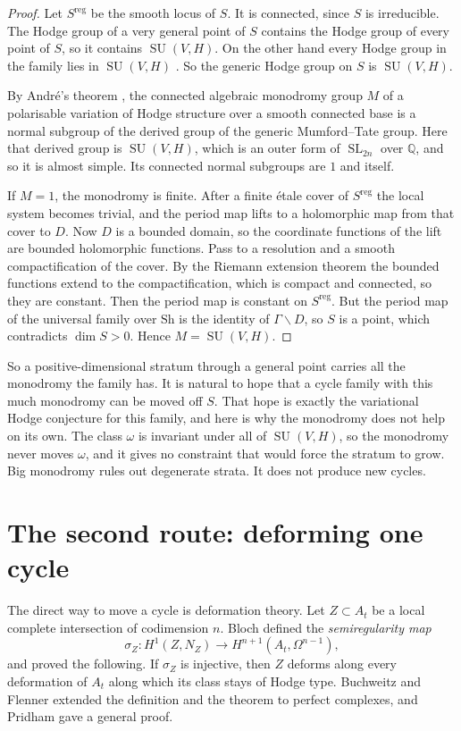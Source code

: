 \documentclass[11pt]{amsart}
\theoremstyle{definition}
\theoremstyle{remark}
\newcommand{\QQ}{\mathbb{Q}}
\newcommand{\SL}{\operatorname{SL}}
\newcommand{\SU}{\operatorname{SU}}
\newcommand{\Sh}{\mathrm{Sh}}
\begin{document}
\begin{proof}
Let $S^{\mathrm{reg}}$ be the smooth locus of $S$. It is connected, since
$S$ is irreducible. The Hodge group of a very general point of $S$ contains
the Hodge group of every point of $S$, so it contains $\SU(V,H)$. On the
other hand every Hodge group in the family lies in $\SU(V,H)$ \cite{BhH8}.
So the generic Hodge group on $S$ is $\SU(V,H)$.

By Andr\'e's theorem \cite{And92}, the connected algebraic monodromy group
$M$ of a polarisable variation of Hodge structure over a smooth connected
base is a normal subgroup of the derived group of the generic
Mumford--Tate group. Here that derived group is $\SU(V,H)$, which is an
outer form of $\SL_{2n}$ over $\QQ$, and so it is almost simple. Its
connected normal subgroups are $1$ and itself.

If $M=1$, the monodromy is finite. After a finite \'etale cover of
$S^{\mathrm{reg}}$ the local system becomes trivial, and the period map
lifts to a holomorphic map from that cover to $D$. Now $D$ is a bounded
domain, so the coordinate functions of the lift are bounded holomorphic
functions. Pass to a resolution and a smooth compactification of the
cover. By the Riemann extension theorem the bounded functions extend to the
compactification, which is compact and connected, so they are constant.
Then the period map is constant on $S^{\mathrm{reg}}$. But the period map of
the universal family over $\Sh$ is the identity of $\Gamma\backslash D$, so
$S$ is a point, which contradicts $\dim S>0$. Hence $M=\SU(V,H)$.
\end{proof}

So a positive-dimensional stratum through a general point carries all the
monodromy the family has. It is natural to hope that a cycle family with
this much monodromy can be moved off $S$. That hope is exactly the
variational Hodge conjecture for this family, and here is why the
monodromy does not help on its own. The class $\omega$ is invariant under
all of $\SU(V,H)$, so the monodromy never moves $\omega$, and it gives no
constraint that would force the stratum to grow. Big monodromy rules out
degenerate strata. It does not produce new cycles.

\section{The second route: deforming one cycle}

The direct way to move a cycle is deformation theory. Let $Z\subset A_{t}$
be a local complete intersection of codimension $n$. Bloch \cite{Blo72}
defined the \emph{semiregularity map}
\[
  \sigma_{Z}\colon H^{1}(Z,N_{Z})\longrightarrow H^{n+1}(A_{t},\Omega^{n-1}),
\]
and proved the following. If $\sigma_{Z}$ is injective, then $Z$ deforms
along every deformation of $A_{t}$ along which its class stays of Hodge type.
Buchweitz and Flenner \cite{BF03} extended the definition and the theorem
to perfect complexes, and Pridham \cite{Pri24} gave a general proof.
\end{document}
